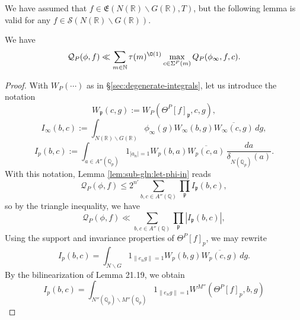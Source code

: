 We have assumed that $f \in \mathfrak{E}(N(\mathbb{R}) \backslash G(\mathbb{R}), T)$, but the following lemma is valid for any $f \in \mathcal{S}(N(\mathbb{R}) \backslash G(\mathbb{R}))$.
\begin{lemma}\label{lem:scratch-research:we-have-begin}
  We have
  \begin{equation}\label{eq:mathc-f_infty-ll}
    \mathcal{Q}_P(\phi,f) \ll \sum_{m \in \mathbb{N}}
    \tau(m)^{\O(1)}
    \max_{c \in \Sigma^P(m)}
    Q_P(\phi_\infty, f, c).
  \end{equation}
\end{lemma}
\begin{proof}
  With $W_P(\dotsb)$ as in \S\ref{sec:degenerate-integrals}, let us introduce the notation
  \begin{equation*}
    W_\mathfrak{p}(c,g) :=
    W_P(\Theta^P[f]_\mathfrak{p}, c, g),
  \end{equation*}
  \begin{equation*}
    I_\infty(b,c) := \int_{N(\mathbb{R}) \backslash G(\mathbb{R}) } \phi_\infty(g) W_\infty(b,g) \overline{W_\infty(c,g)} \, d g,
  \end{equation*}
  \begin{equation*}
    I_p(b,c) := \int_{a \in A''(\mathbb{Q}_p)}
    1_{|a_n| = 1}
    W_p(b,a)
    \overline{W_p(c,a)}
    \, \frac{d a}{\delta_{N(\mathbb{Q}_p)}(a)}.
  \end{equation*}
  With this notation, Lemma \ref{lem:sub-gln:let-phi-in} reads
  \begin{equation*}
    \mathcal{Q}_P(\phi, f) \leq 2^{n '}
    \sum_{b, c \in A ''(\mathbb{Q})}
    \prod_{\mathfrak{p}} I_{\mathfrak{p}}(b, c),
  \end{equation*}
  so by the triangle inequality, we have
  \begin{equation*}
    \mathcal{Q}_P(\phi,f)
    \ll
    \sum_{b,c \in A''(\mathbb{Q})}
    \prod_\mathfrak{p}
    \left\lvert
      I_\mathfrak{p}(b,c)
    \right\rvert,
  \end{equation*}
  Using the support and invariance properties of $\Theta^P[f]_p$, we may rewrite
  \begin{equation*}
    I_p(b, c) = \int_{N \backslash G}
    1 _{ \lVert e_n g \rVert = 1}
    W_p(b, g) \overline{W_p(c, g)} \, d g.
  \end{equation*}
  By the bilinearization of Lemma 21.19, we obtain
  \begin{equation*}
    I_p(b, c) = \int_{N''(\mathbb{Q}_p) \backslash M''(\mathbb{Q}_p)}
    1 _{ \lVert e_n g \rVert = 1} W^{M''}(\Theta^P[f]_p, b, g)

\end{equation*}
\end{proof}
